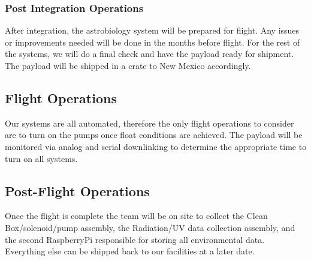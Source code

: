 \subsubsection{Post Integration Operations}

After integration, the astrobiology system will be prepared for flight.  Any issues or improvements needed will be done in the months before flight. For the rest of the systems, we will do a final check and have the payload ready for shipment.  The payload will be shipped in a crate to New Mexico accordingly.

\subsection{Flight Operations}
Our systems are all automated, therefore the only flight operations to consider are to turn on the pumps once float conditions are achieved. The payload will be monitored via analog and serial  downlinking to determine the appropriate time to turn on all systems. 

\subsection{Post-Flight Operations}
Once the flight is complete the team will be on site to collect the Clean Box/solenoid/pump assembly, the Radiation/UV data collection assembly, and the second RaspberryPi responsible for storing all environmental data. Everything else can be shipped back to our facilities at a later date.  




